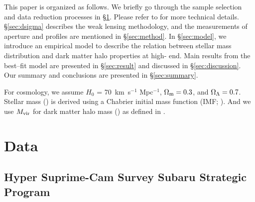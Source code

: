 \documentclass[a4paper,fleqn,usenatbib]{mnras}
\begin{document}
    

    This paper is organized as follows. 
    We briefly go through the sample selection and data reduction processes in 
    \S \ref{sec:data}.  
    Please refer to  for more technical details.
    \S \ref{sec:dsigma} describes the weak lensing methodology, and the 
    measurements of aperture \mstar{} and \mden{} profiles are mentioned in 
    \S \ref{sec:method}.
    In \S \ref{sec:model}, we introduce an empirical model to describe the relation
    between stellar mass distribution and dark matter halo properties at 
    high-\mstar{} end. 
    Main results from the best--fit model are presented in \S \ref{sec:result} and 
    discussed in \S \ref{sec:discussion}. 
    Our summary and conclusions are presented in \S \ref{sec:summary}.

    
    For cosmology, we assume $H_0$ = 70~km~s$^{-1}$ Mpc$^{-1}$, 
    ${\Omega}_{\rm m}=0.3$, and ${\Omega}_{\rm \Lambda}=0.7$.
    Stellar mass (\mstar{}) is derived using a Chabrier initial mass function 
    (IMF; \citealt{Chabrier2003}). 
    And we use $M_{\rm vir}$ for dark matter halo mass (\mhalo{}) as 
    defined in \citealt{BryanNorman1998}.
    
\section{Data}
    \label{sec:data}


\subsection{Hyper Suprime-Cam Survey Subaru Strategic Program}
    \label{sec:hsc}      
\end{document}
